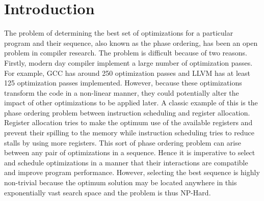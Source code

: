 \documentclass[10pt]{sigplanconf}
\begin{document}
\section{Introduction}
The problem of determining the best set of optimizations for a particular program and their sequence, also known as the phase ordering, has been an open problem in compiler research. The problem is difficult because of two reasons. Firstly, modern day compiler implement a large number of optimization passes. For example, GCC has around 250 optimization passes and LLVM has at least 125 optimization passes implemented. However, because these optimizations transform the code in a non-linear manner, they could potentially alter the impact of other optimizations to be applied later. A classic example of this is the phase ordering problem between instruction scheduling and register allocation. Register allocation tries to make the optimum use of the available registers and prevent their spilling to the memory while instruction scheduling tries to reduce stalls by using more registers. This sort of phase ordering problem can arise between any pair of optimizations in a sequence. Hence it is imperative to select and schedule optimizations in a manner that their interactions are compatible and improve program performance. However, selecting the best sequence is highly non-trivial because the optimum solution may be located anywhere in this exponentially vast search space and the problem is thus NP-Hard.  
\end{document}
